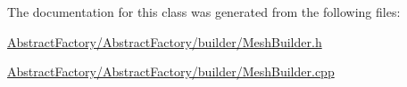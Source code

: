 The documentation for this class was generated from the following files\+:\begin{DoxyCompactItemize}
\item 
\mbox{\hyperlink{_abstract_factory_2_abstract_factory_2builder_2_mesh_builder_8h}{Abstract\+Factory/\+Abstract\+Factory/builder/\+Mesh\+Builder.\+h}}\item 
\mbox{\hyperlink{_abstract_factory_2_abstract_factory_2builder_2_mesh_builder_8cpp}{Abstract\+Factory/\+Abstract\+Factory/builder/\+Mesh\+Builder.\+cpp}}\end{DoxyCompactItemize}
